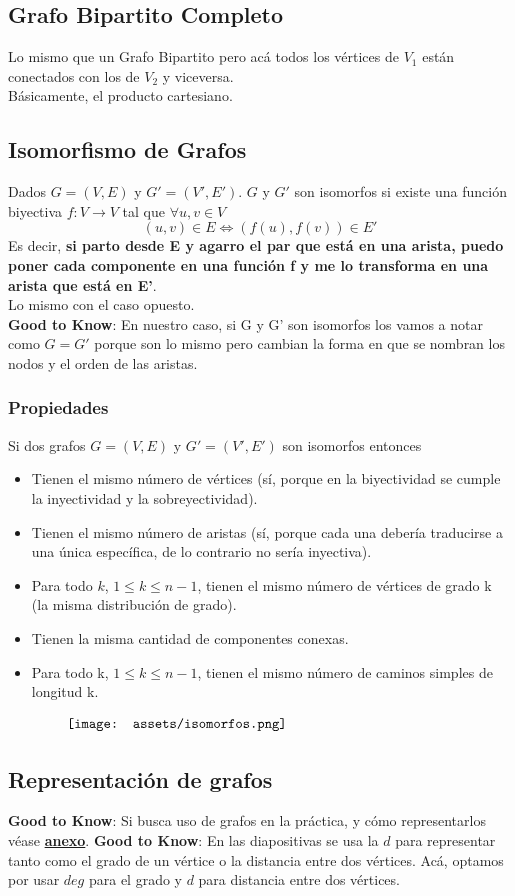 \documentclass[10pt,a4paper]{article}
\begin{document}
\subsection*{Grafo Bipartito Completo}
Lo mismo que un Grafo Bipartito pero acá todos los vértices de $V_{1}$ están conectados con los de $V_{2}$ y viceversa. \\
Básicamente, el producto cartesiano.
\subsection*{Isomorfismo de Grafos}
Dados  $G = (V, E)$ y $G' = (V', E')$. $G$ y $G'$ son isomorfos si existe una función biyectiva $f: V \rightarrow V$ tal que $\forall u,v \in V$ 
\[(u,v) \in E \iff (f(u), f(v)) \in E'\]
Es decir, \textbf{si parto desde E y agarro el par que está en una arista, puedo poner cada componente en una función f y me lo transforma en una arista que está en E'}. \\
Lo mismo con el caso opuesto. \\
\textbf{Good to Know}: En nuestro caso, si G y G' son isomorfos los vamos a notar como $G = G'$ porque son lo mismo pero cambian la forma en que se nombran los nodos y el orden de las aristas.
\subsubsection*{Propiedades}
Si dos grafos $G = (V,E)$ y $G' = (V', E')$ son isomorfos entonces
\begin{itemize}
    \item Tienen el mismo número de vértices (sí, porque en la biyectividad se cumple la inyectividad y la sobreyectividad).
    \item Tienen el mismo número de aristas (sí, porque cada una debería traducirse a una única específica, de lo contrario no sería inyectiva).
    \item Para todo $k$, $1 \le k \le n-1$, tienen el mismo número de vértices de grado k (la misma distribución de grado).
    \item Tienen la misma cantidad de componentes conexas.
    \item Para todo k, $1 \le k \le n-1$, tienen el mismo número de caminos simples de longitud k.
\end{itemize}
\[\begin{minipage}[b]{0.8\textwidth}
    \texttt{[image: assets/isomorfos.png]}
\end{minipage}\]
\subsection*{Representación de grafos}
\textbf{Good to Know}: Si busca uso de grafos en la práctica, y cómo representarlos véase \hyperref[subsec:representacion_grafos_practica]{\textbf{anexo}}.
\textbf{Good to Know}: En las diapositivas se usa la $d$ para representar tanto como el grado de un vértice o la distancia entre dos vértices. Acá, optamos por usar $deg$ para el grado y $d$ para distancia entre dos vértices.
\end{document}
